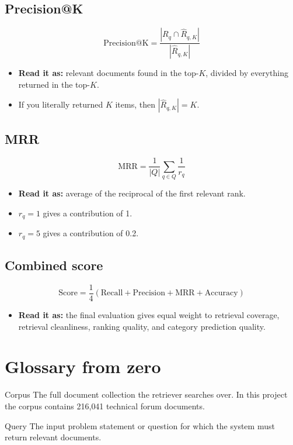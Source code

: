 \documentclass[10pt]{article}
\begin{document}
\subsection*{Precision@K}
\[
\mathrm{Precision@K}=\frac{|R_q\cap\hat{R}_{q,K}|}{|\hat{R}_{q,K}|}
\]
\begin{itemize}
    \item \textbf{Read it as:} relevant documents found in the top-\(K\), divided by everything returned in the top-\(K\).
    \item If you literally returned \(K\) items, then \(|\hat{R}_{q,K}| = K\).
\end{itemize}

\subsection*{MRR}
\[
\mathrm{MRR}=\frac{1}{|Q|}\sum_{q\in Q}\frac{1}{r_q}
\]
\begin{itemize}
    \item \textbf{Read it as:} average of the reciprocal of the first relevant rank.
    \item \(r_q=1\) gives a contribution of 1.
    \item \(r_q=5\) gives a contribution of 0.2.
\end{itemize}

\subsection*{Combined score}
\[
\mathrm{Score} = \frac{1}{4}(\mathrm{Recall}+\mathrm{Precision}+\mathrm{MRR}+\mathrm{Accuracy})
\]
\begin{itemize}
    \item \textbf{Read it as:} the final evaluation gives equal weight to retrieval coverage, retrieval cleanliness, ranking quality, and category prediction quality.
\end{itemize}

\section{Glossary from zero}

\begin{termcard*}{Corpus}
The full document collection the retriever searches over. In this project the corpus contains 216{,}041 technical forum documents.
\end{termcard*}

\begin{termcard*}{Query}
The input problem statement or question for which the system must return relevant documents.
\end{termcard*}
\end{document}

